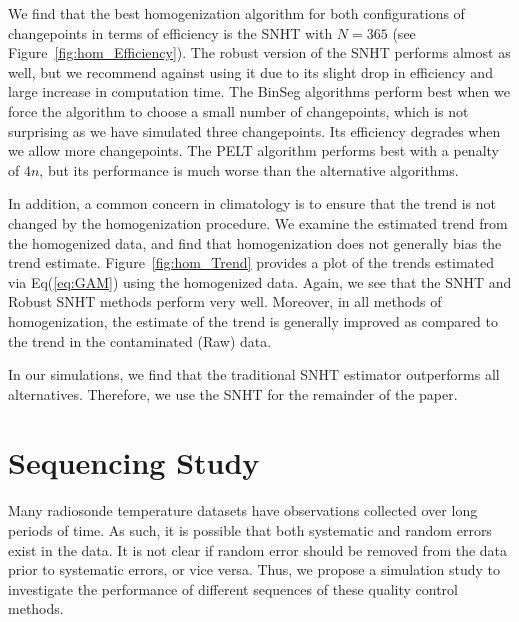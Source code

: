 \documentclass[12pt]{article}
\begin{document}
\begin{doublespacing}
We find that the best homogenization algorithm for both configurations of changepoints in terms of efficiency is the SNHT with $N=365$ (see Figure~\ref{fig:hom_Efficiency}).  The robust version of the SNHT performs almost as well, but we recommend against using it due to its slight drop in efficiency and large increase in computation time.  The BinSeg algorithms perform best when we force the algorithm to choose a small number of changepoints, which is not surprising as we have simulated three changepoints.  Its efficiency degrades when we allow more changepoints.  The PELT algorithm performs best with a penalty of $4n$, but its performance is much worse than the alternative algorithms.

In addition, a common concern in climatology is to ensure that the trend is not changed by the homogenization procedure.  We examine the estimated trend from the homogenized data, and find that homogenization does not generally bias the trend estimate.  Figure~\ref{fig:hom_Trend} provides a plot of the trends estimated via Eq(\ref{eq:GAM}) using the homogenized data.  Again, we see that the SNHT and Robust SNHT methods perform very well.  Moreover, in all methods of homogenization, the estimate of the trend is generally improved as compared to the trend in the contaminated (Raw) data.

In our simulations, we find that the traditional SNHT estimator outperforms all alternatives.  Therefore, we use the SNHT for the remainder of the paper.

\section{Sequencing Study}

Many radiosonde temperature datasets have observations collected over long periods of time.  As such, it is possible that both systematic and random errors exist in the data.  It is not clear if random error should be removed from the data prior to systematic errors, or vice versa.  Thus, we propose a simulation study to investigate the performance of different sequences of these quality control methods.


\end{doublespacing}
\end{document}
